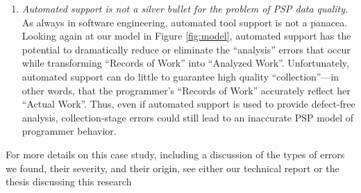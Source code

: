 \begin{enumerate}
\item {\em Automated support is not a silver bullet for the problem of PSP
    data quality.} As always in software engineering, automated tool
  support is not a panacea. Looking again at our model in Figure
  \ref{fig:model}, automated support has the potential to dramatically
  reduce or eliminate the ``analysis'' errors that occur while transforming
  ``Records of Work'' into ``Analyzed Work''. Unfortunately, automated
  support can do little to guarantee high quality ``collection''---in other
  words, that the programmer's ``Records of Work'' accurately reflect her
  ``Actual Work''.  Thus, even if automated support is used to provide
  defect-free analysis, collection-stage errors could still lead to an
  inaccurate PSP model of programmer behavior.

\end{enumerate}


For more details on this case study, including a discussion of the types
of errors we found, their severity, and their origin, see either our
technical report \cite{csdl-98-04} or the thesis discussing this
research \cite{csdl-98-08}



 




